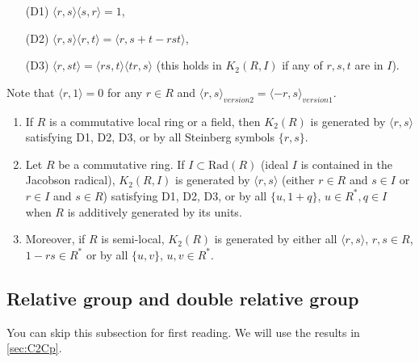 \begin{itemize}
	\item[(D1)] $\langle r,s\rangle \langle s,r \rangle=1$,\\
	\item[(D2)] $\langle r,s\rangle \langle r,t \rangle=\langle r,s+t-rst \rangle$, \\
	\item[(D3)] $\langle r,st\rangle =\langle rs,t\rangle \langle tr,s\rangle$ (this holds in $K_2(R,I)$ if any of $r,s,t$ are in $I$).
\end{itemize}

Note that $\langle r,1\rangle=0$ for any $r\in R$ and $\langle r,s \rangle_{version 2}=\langle -r,s \rangle_{version 1}$.
\begin{theorem}
	\begin{enumerate}
		\item If $R$ is a {\color{green} commutative local ring or a field}, then $K_2(R)$ is generated by $\langle r,s \rangle$ satisfying D1, D2, D3, or by all Steinberg symbols $\{r,s\}$. \\
		\item Let $R$ be a commutative ring. If $I \subset \mathrm{Rad}(R)$ (ideal $I$ is contained in the Jacobson radical), $K_2(R,I)$ is generated by $\langle r,s \rangle$ (either $r\in R$ and $s\in I$ or $r\in I$ and $s\in R$) satisfying D1, D2, D3, or by all $\{u, 1 +q\}$, $u\in R^*, q\in I$ when $R$ is additively generated by its units.\\
		\item Moreover,  if $R$ is semi-local, $K_2(R)$ is generated by either all $\langle r,s \rangle$, $r, s\in R$, $1-rs\in R^*$ or by all $\{u,v\}$, $u, v\in R^*$.
	\end{enumerate}
	
\end{theorem}



















\subsection{Relative group and double relative group} %
\label{sub:relative_group}
You can skip this subsection for first reading. We will use the results in \ref{sec:C2Cp}.

